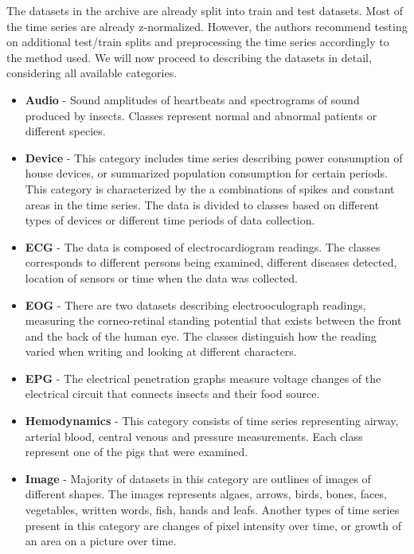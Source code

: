 \documentclass[a4paper,11pt,twoside]{report}
\theoremstyle{definition}
\begin{document}
The datasets in the archive are already split into train and test datasets.  Most of the time series are already z-normalized.  However, the authors recommend testing on additional test/train splits and preprocessing the time series accordingly to the method used.  We will now proceed to describing the datasets in detail, considering all available categories.

\begin{itemize}
\item \textbf{Audio} - Sound amplitudes of heartbeats and spectrograms of sound produced by insects. Classes represent normal and abnormal patients or different species.

\item \textbf{Device} - This category includes time series describing power consumption of house devices, or summarized population consumption for certain periods. This category is characterized by the a combinations of spikes and constant areas in the time series. The data is divided to classes based on different types of devices or different time periods of data collection.

\item \textbf{ECG} - The data is composed of electrocardiogram readings. The classes corresponds to different persons being examined, different diseases detected, location of sensors or time when the data was collected.

\item \textbf{EOG} - There are two datasets describing electrooculograph readings, measuring the corneo-retinal standing potential that exists between the front and the back of the human eye. The classes distinguish how the reading varied when writing and looking at different characters.
\item \textbf{EPG} - The electrical penetration graphs measure voltage changes of the electrical circuit that connects insects and their food source.
\item \textbf{Hemodynamics} - This category consists of time series representing airway, arterial blood, central venous and pressure measurements. Each class represent one of the pigs that were examined.

\item \textbf{Image} - Majority of datasets in this category are outlines of images of different shapes. The images represents algaes, arrows, birds, bones, faces, vegetables, written words, fish, hands and leafs. Another types of time series present in this category are changes of pixel intensity over time, or growth of an area on a picture over time.


\end{itemize}
\end{document}
